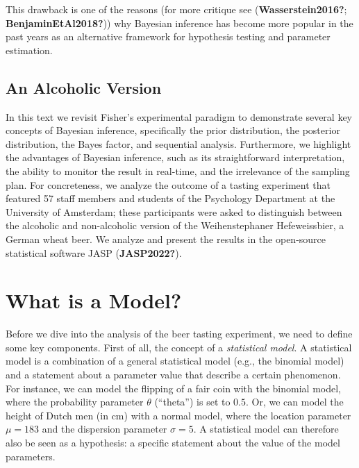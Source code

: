 \documentclass[
  letterpaper,
  DIV=11,
  numbers=noendperiod]{scrreprt}
\begin{document}
This drawback is one of the reasons (for more critique see
(\textbf{Wasserstein2016?}; \textbf{BenjaminEtAl2018?})) why Bayesian
inference has become more popular in the past years as an alternative
framework for hypothesis testing and parameter estimation.

\hypertarget{an-alcoholic-version}{%
\section{An Alcoholic Version}\label{an-alcoholic-version}}

In this text we revisit Fisher's experimental paradigm to demonstrate
several key concepts of Bayesian inference, specifically the prior
distribution, the posterior distribution, the Bayes factor, and
sequential analysis. Furthermore, we highlight the advantages of
Bayesian inference, such as its straightforward interpretation, the
ability to monitor the result in real-time, and the irrelevance of the
sampling plan. For concreteness, we analyze the outcome of a tasting
experiment that featured 57 staff members and students of the Psychology
Department at the University of Amsterdam; these participants were asked
to distinguish between the alcoholic and non-alcoholic version of the
Weihenstephaner Hefeweissbier, a German wheat beer. We analyze and
present the results in the open-source statistical software JASP
(\textbf{JASP2022?}).


\hypertarget{what-is-a-model}{%
\chapter{What is a Model?}\label{what-is-a-model}}

Before we dive into the analysis of the beer tasting experiment, we need
to define some key components. First of all, the concept of a
\emph{statistical model}. A statistical model is a combination of a
general statistical model (e.g., the binomial model) and a statement
about a parameter value that describe a certain phenomenon. For
instance, we can model the flipping of a fair coin with the binomial
model, where the probability parameter \(\theta\) (``theta'') is set to
\(0.5\). Or, we can model the height of Dutch men (in cm) with a normal
model, where the location parameter \(\mu = 183\) and the dispersion
parameter \(\sigma = 5\). A statistical model can therefore also be seen
as a hypothesis: a specific statement about the value of the model
parameters.
\end{document}
